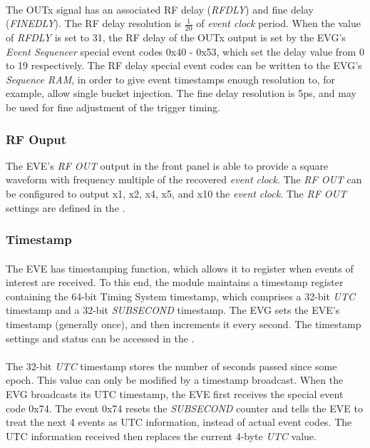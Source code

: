 \documentclass[openany]{article}
\begin{document}
			\paragraph{} The OUTx signal has an associated RF delay (\emph{RFDLY}) and fine delay (\emph{FINEDLY}). The RF delay resolution is \(\frac{1}{20}\) of \emph{event clock} period. When the value of \emph{RFDLY} is set to 31, the RF delay of the OUTx output is set by the EVG's \emph{Event Sequencer} special event codes 0x40 - 0x53, which set the delay value from 0 to 19 respectively. The RF delay special event codes can be written to the EVG's \emph{Sequence RAM}, in order to give event timestamps enough resolution to, for example, allow single bucket injection. The fine delay resolution is 5ps, and may be used for fine adjustment of the trigger timing.

		\subsubsection{RF Ouput}\label{sec:eve-rf-output}

			The EVE's \emph{RF OUT} output in the front panel is able to provide a square waveform with frequency multiple of the recovered \emph{event clock}. The \emph{RF OUT} can be configured to output x1, x2, x4, x5, and x10 the \emph{event clock}. The \emph{RF OUT} settings are defined in the .

		\subsubsection{Timestamp}\label{sec:eve-timestamp}
		
			\paragraph{} The EVE has timestamping function, which allows it to register when events of interest are received. To this end, the module maintains a timestamp register containing the 64-bit Timing System timestamp, which comprises a 32-bit \emph{UTC} timestamp and a 32-bit \emph{SUBSECOND} timestamp. The EVG sets the EVE's timestamp (generally once), and then increments it every second. The timestamp settings and status can be accessed in the .
			\paragraph{} The 32-bit \emph{UTC} timestamp stores the number of seconds passed since some epoch. This value can only be modified by a timestamp broadcast. When the EVG broadcasts its UTC timestamp, the EVE first receives the special event code 0x74. The event 0x74 resets the \emph{SUBSECOND} counter and tells the EVE to treat the next 4 events as UTC information, instead of actual event codes. The UTC information received then replaces the current 4-byte \emph{UTC} value.
\end{document}

